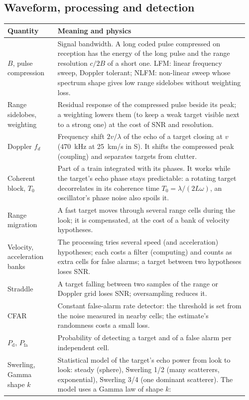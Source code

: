 \documentclass[11pt,a4paper]{article}
\newcommand{\Pd}{P_{\mathrm d}}
\newcommand{\Pfa}{P_{\mathrm{fa}}}
\begin{document}
\subsection{Waveform, processing and detection}
{\small
\begin{longtable}{@{}p{0.2\linewidth}p{0.76\linewidth}@{}}
\toprule
Quantity & Meaning and physics\\
\midrule
\endhead
$B$, pulse compression & Signal bandwidth. A long coded pulse compressed on reception has the energy of the long pulse
and the range resolution $c/2B$ of a short one. LFM: linear frequency sweep, Doppler tolerant; NLFM: non-linear sweep
whose spectrum shape gives low range sidelobes without weighting loss.\\
Range sidelobes, weighting & Residual response of the compressed pulse beside its peak; a weighting lowers them (to keep
a weak target visible next to a strong one) at the cost of SNR and resolution.\\
Doppler $f_d$ & Frequency shift $2v/\lambda$ of the echo of a target closing at $v$ (\SI{470}{kHz} at \SI{25}{km/s} in
S). It shifts the compressed peak (coupling) and separates targets from clutter.\\
Coherent block, $T_0$ & Part of a train integrated with its phases. It works while the target's echo phase stays
predictable: a rotating target decorrelates in its coherence time $T_0 = \lambda/(2L\omega)$, an oscillator's phase
noise also spoils it.\\
Range migration & A fast target moves through several range cells during the look; it is compensated, at the cost of a
bank of velocity hypotheses.\\
Velocity, acceleration banks & The processing tries several speed (and acceleration) hypotheses; each costs a filter
(computing) and counts as extra cells for false alarms; a target between two hypotheses loses SNR.\\
Straddle & A target falling between two samples of the range or Doppler grid loses SNR; oversampling reduces it.\\
CFAR & Constant false-alarm rate detector: the threshold is set from the noise measured in nearby cells; the
estimate's randomness costs a small loss.\\
$\Pd$, $\Pfa$ & Probability of detecting a target and of a false alarm per independent cell.\\
Swerling, Gamma shape $k$ & Statistical model of the target's echo power from look to look: steady (sphere), Swerling
1/2 (many scatterers, exponential), Swerling 3/4 (one dominant scatterer). The model uses a Gamma law of shape $k$:

\end{longtable}}
\end{document}

